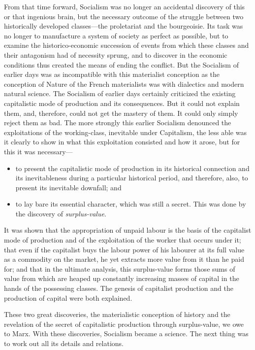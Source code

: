 From that time forward, Socialism was no longer an accidental discovery of this
or that ingenious brain, but the necessary outcome of the struggle between two
historically developed classes---the proletariat and the bourgeoisie. Its task
was no longer to manufacture a system of society as perfect as possible, but to
examine the historico-economic succession of events from which these classes and
their antagonism had of necessity sprung, and to discover in the economic
conditions thus created the means of ending the conflict. But the Socialism of
earlier days was as incompatible with this materialist conception as the
conception of Nature of the French materialists was with dialectics and modern
natural science. The Socialism of earlier days certainly criticized the existing
capitalistic mode of production and its consequences. But it could not explain
them, and, therefore, could not get the mastery of them. It could only simply
reject them as bad. The more strongly this earlier Socialism denounced the
exploitations of the working-class, inevitable under Capitalism, the less able
was it clearly to show in what this exploitation consisted and how it arose, but
for this it was necessary---
%
\begin{itemize}
  \item{
    to present the capitalistic mode of production in its historical connection
    and its inevitableness during a particular historical period, and therefore,
    also, to present its inevitable downfall; and
  }
  \item{
    to lay bare its essential character, which was still a secret. This was done
    by the discovery of \emph{surplus-value}.
  }
\end{itemize}
%
It was shown that the appropriation of unpaid labour is the basis of the
capitalist mode of production and of the exploitation of the worker that occurs
under it; that even if the capitalist buys the labour power of his labourer at
its full value as a commodity on the market, he yet extracts more value from it
than he paid for; and that in the ultimate analysis, this surplus-value forms
those sums of value from which are heaped up constantly increasing masses of
capital in the hands of the possessing classes. The genesis of capitalist
production and the production of capital were both explained.

These two great discoveries, the materialistic conception of history and the
revelation of the secret of capitalistic production through surplus-value, we
owe to Marx. With these discoveries, Socialism became a science. The next thing
was to work out all its details and relations.

\printendnotes

